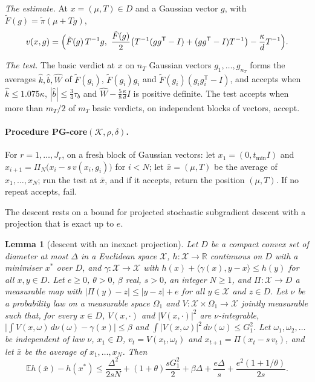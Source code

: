 \documentclass[11pt]{amsart}
\newtheorem{lemma}[theorem]{Lemma}
\theoremstyle{definition}
\numberwithin{equation}{section}
\newcommand{\R}{\mathbb{R}}
\newcommand{\E}{\mathbb{E}}
\newcommand{\cK}{\mathcal{K}}
\newcommand{\ip}[1]{\langle #1\rangle}
\begin{document}
\emph{The estimate.} At $x=(\mu,T)\in D$ and a Gaussian vector $g$, with $\tilde F(g)=\tilde\pi(\mu+Tg)$,
\[
v(x,g)=\Bigl(\tilde F(g)\,T^{-1}g,\ \frac{\tilde F(g)}2\bigl(T^{-1}(gg^{\mathsf T}-I)+(gg^{\mathsf T}-I)T^{-1}\bigr)-\frac\kappa dT^{-1}\Bigr).
\]

\emph{The test.} The basic verdict at $x$ on $n_T$ Gaussian vectors $g_1,\dots,g_{n_T}$ forms the averages $\hat k,\hat b,\hat W$ of $\tilde F(g_i)$, $\tilde F(g_i)g_i$ and $\tilde F(g_i)(g_ig_i^{\mathsf T}-I)$, and accepts when $\hat k\le1.075\kappa$, $|\hat b|\le\frac34\tau_b$ and $\hat W-\frac58\frac\kappa dI$ is positive definite. The test accepts when more than $m_T/2$ of $m_T$ basic verdicts, on independent blocks of vectors, accept.

\paragraph{Procedure PG-core$(\cK,\rho,\delta)$.} For $r=1,\dots,J_r$, on a fresh block of Gaussian vectors: let $x_1=(0,t_{\min}I)$ and $x_{i+1}=\Pi_N\bigl(x_i-s\,v(x_i,g_i)\bigr)$ for $i<N$; let $\bar x=(\mu,T)$ be the average of $x_1,\dots,x_N$; run the test at $\bar x$, and if it accepts, return the position $(\mu,T)$. If no repeat accepts, fail.

The descent rests on a bound for projected stochastic subgradient descent with a projection that is exact up to $e$.

\begin{lemma}[descent with an inexact projection]\label{lem:sgde}
Let $D$ be a compact convex set of diameter at most $\Delta$ in a Euclidean space $\mathcal X$, $h:\mathcal X\to\R$ continuous on $D$ with a minimiser $x^*$ over $D$, and $\gamma:\mathcal X\to\mathcal X$ with $h(x)+\ip{\gamma(x),y-x}\le h(y)$ for all $x,y\in D$. Let $e\ge0$, $\theta>0$, $\beta$ real, $s>0$, an integer $N\ge1$, and $\Pi:\mathcal X\to D$ a measurable map with $|\Pi(y)-z|\le|y-z|+e$ for all $y\in\mathcal X$ and $z\in D$. Let $\nu$ be a probability law on a measurable space $\Omega_1$ and $V:\mathcal X\times\Omega_1\to\mathcal X$ jointly measurable such that, for every $x\in D$, $V(x,\cdot)$ and $|V(x,\cdot)|^2$ are $\nu$-integrable, $\bigl|\int V(x,\omega)\,d\nu(\omega)-\gamma(x)\bigr|\le\beta$ and $\int|V(x,\omega)|^2\,d\nu(\omega)\le G_1^2$. Let $\omega_1,\omega_2,\dots$ be independent of law $\nu$, $x_1\in D$, $v_t=V(x_t,\omega_t)$ and $x_{t+1}=\Pi(x_t-s\,v_t)$, and let $\bar x$ be the average of $x_1,\dots,x_N$. Then
\[
\E h(\bar x)-h(x^*)\le\frac{\Delta^2}{2sN}+(1+\theta)\frac{sG_1^2}2+\beta\Delta+\frac{e\Delta}s+\frac{e^2(1+1/\theta)}{2s}.
\]
\end{lemma}
\end{document}
